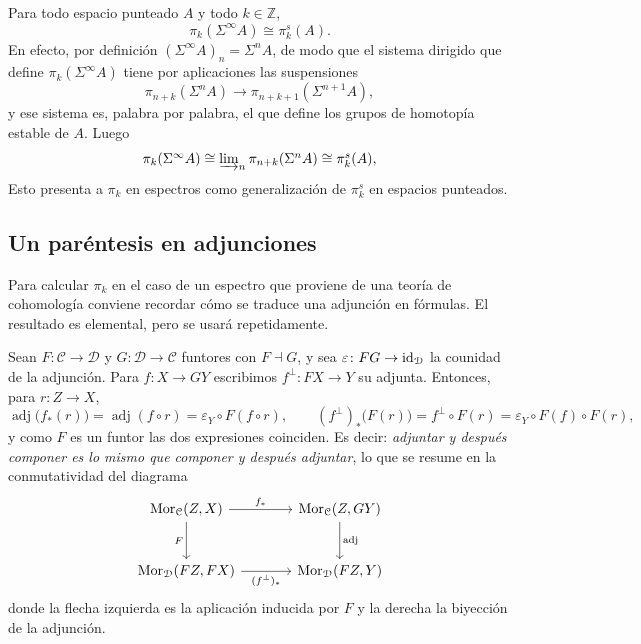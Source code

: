 \begin{ejem}\label{ejem:pi-suspension-infinito}
Para todo espacio punteado $A$ y todo $k\in\mathbb Z$,
\[
\pi_k(\Sigma^\infty A)\cong\pi_k^s(A).
\]
En efecto, por definición $(\Sigma^\infty A)_n=\Sigma^nA$, de modo que el sistema dirigido que define $\pi_k(\Sigma^\infty A)$ tiene por aplicaciones las suspensiones
\[
\pi_{n+k}(\Sigma^nA)\longrightarrow\pi_{n+k+1}(\Sigma^{n+1}A),
\]
y ese sistema es, palabra por palabra, el que define los grupos de homotopía estable de $A$. Luego
\[\textstyle
\pi_k(\Sigma^\infty A)\cong\varinjlim\nolimits_n\pi_{n+k}(\Sigma^nA)\cong \pi_k^s(A),
\]
Esto presenta a $\pi_k$ en espectros como generalización de $\pi^s_k$ en espacios punteados.
\end{ejem}

\subsection{Un paréntesis en adjunciones}

Para calcular $\pi_k$ en el caso de un espectro que proviene de una teoría de cohomología conviene recordar cómo se traduce una adjunción en fórmulas. El resultado es elemental, pero se usará repetidamente.

Sean $F\colon\mathcal C\to\mathcal D$ y $G\colon\mathcal D\to\mathcal C$ funtores con $F\dashv G$, y sea $\varepsilon\colon FG\to\operatorname{id}_{\mathcal D}$ la counidad de la adjunción. Para $f\colon X\to GY$ escribimos $f^{\perp}\colon FX\to Y$ su adjunta. Entonces, para $r\colon Z\to X$,
\[
\operatorname{adj}\bigl(f_*(r)\bigr)=\operatorname{adj}(f\circ r)=\varepsilon_Y\circ F(f\circ r),
\qquad
(f^{\perp})_*\bigl(F(r)\bigr)=f^{\perp}\circ F(r)=\varepsilon_Y\circ F(f)\circ F(r),
\]
y como $F$ es un funtor las dos expresiones coinciden. Es decir: \emph{adjuntar y después componer es lo mismo que componer y después adjuntar}, lo que se resume en la conmutatividad del diagrama
\[
\begin{tikzcd}[column sep=large, row sep=large]
\hom_{\mathcal C}(Z,X) \arrow[r,"f_*"] \arrow[d,"F"'] & \hom_{\mathcal C}(Z,GY) \arrow[d,"\operatorname{adj}"]\\
\hom_{\mathcal D}(FZ,FX) \arrow[r,"(f^{\perp})_*"'] & \hom_{\mathcal D}(FZ,Y)
\end{tikzcd}
\]
donde la flecha izquierda es la aplicación inducida por $F$ y la derecha la biyección de la adjunción.

